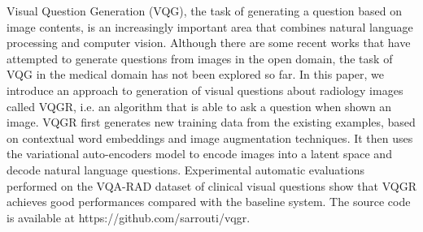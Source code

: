 Visual Question Generation (VQG), the task of generating a question based on image contents, is an increasingly important area that combines natural language processing and computer vision. Although there are some recent works that have attempted to generate questions from images in the open domain, the task of VQG in the medical domain has not been explored so far. In this paper, we introduce an approach to generation of visual questions about radiology images called VQGR, i.e. an algorithm that is able to ask a question when shown an image. VQGR first generates new training data from the existing examples, based on contextual word embeddings and image augmentation techniques. It then uses the variational auto-encoders model to encode images into a latent space and decode natural language questions. Experimental automatic evaluations performed on the VQA-RAD dataset of clinical visual questions show that VQGR achieves good performances compared with the baseline system. The source code is available at https://github.com/sarrouti/vqgr.
